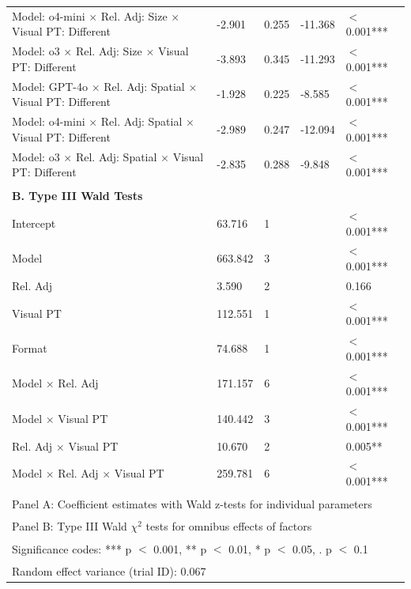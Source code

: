 \begin{table}[!h]
{\begin{tabular}[t]{lllll}
Model: o4-mini $\times$ Rel. Adj: Size $\times$ Visual PT: Different & -2.901 & 0.255 & -11.368 & $<$ 0.001***\\
Model: o3 $\times$ Rel. Adj: Size $\times$ Visual PT: Different & -3.893 & 0.345 & -11.293 & $<$ 0.001***\\
Model: GPT-4o $\times$ Rel. Adj: Spatial $\times$ Visual PT: Different & -1.928 & 0.225 & -8.585 & $<$ 0.001***\\
Model: o4-mini $\times$ Rel. Adj: Spatial $\times$ Visual PT: Different & -2.989 & 0.247 & -12.094 & $<$ 0.001***\\
Model: o3 $\times$ Rel. Adj: Spatial $\times$ Visual PT: Different & -2.835 & 0.288 & -9.848 & $<$ 0.001***\\
 &  &  &  & \\
\textbf{B. Type III Wald Tests} &  &  &  & \\
Intercept & 63.716 & 1 &  & $<$ 0.001***\\
Model & 663.842 & 3 &  & $<$ 0.001***\\
Rel. Adj & 3.590 & 2 &  & 0.166\\
Visual PT & 112.551 & 1 &  & $<$ 0.001***\\
Format & 74.688 & 1 &  & $<$ 0.001***\\
Model $\times$ Rel. Adj & 171.157 & 6 &  & $<$ 0.001***\\
Model $\times$ Visual PT & 140.442 & 3 &  & $<$ 0.001***\\
Rel. Adj $\times$ Visual PT & 10.670 & 2 &  & 0.005**\\
Model $\times$ Rel. Adj $\times$ Visual PT & 259.781 & 6 &  & $<$ 0.001***\\
\bottomrule
\multicolumn{5}{l}{\textsuperscript{} Panel A: Coefficient estimates with Wald z-tests for individual parameters}\\
\multicolumn{5}{l}{\textsuperscript{} Panel B: Type III Wald $\chi^2$ tests for omnibus effects of factors}\\
\multicolumn{5}{l}{\textsuperscript{} Significance codes: *** p $<$ 0.001, ** p $<$ 0.01, * p $<$ 0.05, . p $<$ 0.1}\\
\multicolumn{5}{l}{\textsuperscript{} Random effect variance (trial ID): 0.067}\\
\end{tabular}}
\end{table}
